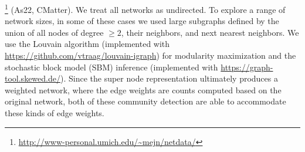 \footnote{\url{http://www-personal.umich.edu/~mejn/netdata/}} 
(As22, CMatter). We treat all networks as undirected. To explore a range of network sizes, in some of these cases we used large subgraphs defined by the union of all nodes of degree $\geq 2$, their neighbors, and next nearest neighbors. We use the Louvain algorithm (implemented with \url{https://github.com/vtraag/louvain-igraph})
for modularity maximization \cite{blondel} and the stochastic block model (SBM) inference (implemented with \url{https://graph-tool.skewed.de/}).
Since the super node representation ultimately produces a weighted network, where the edge weights are counts computed based on the original network, both of these community detection are able to accommodate these kinds of edge weights. 

